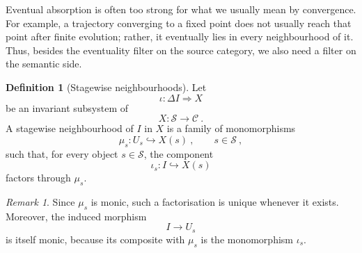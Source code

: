 \documentclass[a4paper,reqno,oneside]{amsart}
\theoremstyle{definition}
\newtheorem{definition}[theorem]{Definition}
\theoremstyle{remark}
\newtheorem{remark}[theorem]{Remark}
\numberwithin{equation}{section}
\begin{document}
	
	
	
	Eventual absorption is often too strong for what we usually mean by
	convergence. For example, a trajectory converging to a fixed point does not
	usually reach that point after finite evolution; rather, it eventually lies
	in every neighbourhood of it. Thus, besides the eventuality filter on the
	source category, we also need a filter on the semantic side.
	
	\begin{definition}[Stagewise neighbourhoods]
		Let
		\begin{equation}
			\iota\colon \Delta I\Longrightarrow X
		\end{equation}
		be an invariant subsystem of
		\begin{equation}
			X\colon \mathcal S\to\mathcal C \ .
		\end{equation}
		A stagewise neighbourhood of $I$ in $X$ is a family of monomorphisms
		\begin{equation}
			\mu_s\colon U_s\hookrightarrow X(s) \ ,
			\qquad s\in\mathcal S \ ,
		\end{equation}
		such that, for every object $s\in\mathcal S$, the component
		\begin{equation}
			\iota_s\colon I\hookrightarrow X(s)
		\end{equation}
		factors through $\mu_s$.
	\end{definition}
	
	\begin{remark}
		Since $\mu_s$ is monic, such a factorisation is unique whenever it exists. Moreover, the induced morphism
		\begin{equation}
			I\longrightarrow U_s
		\end{equation}
		is itself monic, because its composite with $\mu_s$ is the monomorphism $\iota_s$.
	\end{remark}
	
\end{document}
